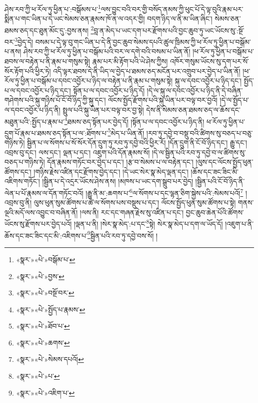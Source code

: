 ཤེས་རབ་ཀྱི་ཕ་རོལ་ཏུ་ཕྱིན་པ་:བསྒོམས་པ་\footnote{«སྣར་»«པེ་»བསྒོམ་པ་}ལས་བྱུང་བའི་བར་གྱི་བསོད་ནམས་ཀྱི་ཕུང་པོ་དེ་ལྟ་བུའི་རྣམ་པར་སྨིན་པ་གང་ཡིན་པ་དེ་ཡང་སེམས་ཅན་རྣམས་ཁོ་ན་ལ་འདར་གྱི། བདག་ཉིད་ལ་ནི་མ་ཡིན་ཞིང་། སེམས་ཅན་ཐམས་ཅད་དང་ཐུན་མོང་དུ་:བྱས་ནས། \footnote{«སྣར་»«པེ་»བྱས་}བླ་ན་མེད་པ་ཡང་དག་པར་རྫོགས་པའི་བྱང་ཆུབ་ཏུ་ཡང་ཡོངས་སུ་:སྔོ་བར་\footnote{«སྣར་»«པེ་»བསྔོ་བར་}བྱེད་དེ། བསམ་པ་དེ་ལྟ་བུ་གང་ཡིན་པ་དེ་ནི་བྱང་ཆུབ་སེམས་དཔའི་ཚུལ་ཁྲིམས་ཀྱི་ཕ་རོལ་ཏུ་ཕྱིན་པ་བསྒོམ་པ་ནས། ཤེས་རབ་ཀྱི་ཕ་རོལ་ཏུ་ཕྱིན་པ་བསྒོམ་པའི་བར་ལ་དགེ་བའི་བསམ་པ་ཡིན་ནོ། །ཕ་རོལ་ཏུ་ཕྱིན་པ་བསྒོམ་པ་ཐབས་ལ་བརྟེན་པ་ནི་རྣམ་པ་གསུམ་སྟེ། རྣམ་པར་མི་རྟོག་པའི་ཡེ་ཤེས་ཀྱིས། འཁོར་གསུམ་ཡོངས་སུ་དག་པར་སོ་སོར་རྟོག་པའི་ཕྱིར་ཏེ། འདི་ལྟར་ཐབས་དེ་ནི་ཡིད་ལ་བྱེད་པ་ཐམས་ཅད་མངོན་པར་འགྲུབ་པར་བྱེད་པ་ཡིན་ནོ། །ཕ་རོལ་ཏུ་ཕྱིན་པ་བསྒོམ་པ་དབང་འབྱོར་པ་ཉིད་ལ་བརྟེན་པ་ནི་རྣམ་པ་གསུམ་སྟེ། སྐུ་ལ་དབང་འབྱོར་པ་ཉིད་དང་། སྤྱོད་པ་ལ་དབང་འབྱོར་པ་ཉིད་དང་། སྟོན་པ་ལ་དབང་འབྱོར་པ་ཉིད་དོ། །དེ་ལ་སྐུ་ལ་དབང་འབྱོར་པ་ཉིད་ནི་དེ་བཞིན་གཤེགས་པའི་སྐུ་གཉིས་པོ་ངོ་བོ་ཉིད་ཀྱི་སྐུ་དང་། ལོངས་སྤྱོད་རྫོགས་པའི་སྐུ་ཡིན་པར་བལྟ་བར་བྱའོ། །དེ་ལ་སྤྱོད་པ་ལ་དབང་འབྱོར་པ་ཉིད་ནི། སྤྲུལ་པའི་སྐུ་ཡིན་པར་བལྟ་བར་བྱ་སྟེ། དེས་ནི་སེམས་ཅན་ཐམས་ཅད་ལ་ཆོས་དང་མཐུན་པའི་:སྤྱོད་པ་རྣམ་པ་\footnote{«སྣར་»«པེ་»སྤྱོད་པ་རྣམས་}ཐམས་ཅད་སྟོན་པར་བྱེད་དོ། །སྟོན་པ་ལ་དབང་འབྱོར་པ་ཉིད་ནི། ཕ་རོལ་ཏུ་ཕྱིན་པ་དྲུག་པོ་རྣམ་པ་ཐམས་ཅད་སྟོན་པ་ལ་:ཐོགས་པ་\footnote{«སྣར་»«པེ་»ཐོབ་པ་}མེད་པ་ཡིན་ནོ། །རབ་ཏུ་དབྱེ་བ་བསྡུ་བའི་ཚིགས་སུ་བཅད་པ་བཅུ་གཉིས་ཏེ། སྦྱིན་པ་ལ་སོགས་པ་སོ་སོར་དོན་དྲུག་ཏུ་རབ་ཏུ་དབྱེ་བའི་ཕྱིར་རོ། །དོན་དྲུག་ནི་ངོ་བོ་ཉིད་དང་། རྒྱུ་དང་། འབྲས་བུ་དང་། ལས་དང་། ལྡན་པ་དང་། འཇུག་པའི་དོན་རྣམས་སོ། །དེ་ལ་སྦྱིན་པའི་རབ་ཏུ་དབྱེ་བ་ལ་ཚིགས་སུ་བཅད་པ་གཉིས་ཏེ། དོན་རྣམས་གཏོང་བར་བྱེད་པ་དང་། །རྩ་བ་སེམས་པ་ལ་བརྟེན་དང་། །ལུས་དང་ལོངས་སྤྱོད་ཕུན་ཚོགས་དང་། །གཉིས་རྗེས་འཛིན་དང་རྫོགས་བྱེད་དང་། །དེ་ཡང་སེར་སྣ་མེད་ལྡན་དང་། །ཆོས་དང་ཟང་ཟིང་མི་འཇིགས་གཏོང་། །སྦྱིན་པ་དེ་འདྲར་ཡོངས་ཤེས་ནས། །མཁས་པ་ཡང་དག་སྒྲུབ་པར་བྱེད། །སྦྱིན་པའི་ངོ་བོ་ཉིད་ནི་ལེན་པ་པོ་རྣམས་ལ་དོན་གཏོང་བའོ། །རྒྱུ་ནི་མ་:ཆགས་པ་\footnote{«སྣར་»«པེ་»ཆགས་}ལ་སོགས་པ་དང་ལྷན་ཅིག་སྐྱེས་པའི་:སེམས་པའོ།\footnote{«སྣར་»«པེ་»སེམས་དཔའོ།} །འབྲས་བུ་ནི། ལུས་ཕུན་སུམ་ཚོགས་པ་ཚེ་ལ་སོགས་པས་བསྡུས་པ་དང་། ལོངས་སྤྱོད་ཕུན་སུམ་ཚོགས་པ་སྟེ། གནས་ལྔའི་མདོ་ལས་འབྱུང་བ་བཞིན་ནོ། །ལས་ནི། རང་དང་གཞན་རྗེས་སུ་འཛིན་པ་དང་། བྱང་ཆུབ་ཆེན་པོའི་ཚོགས་ཡོངས་སུ་རྫོགས་པར་བྱེད་པའོ། །ལྡན་པ་ནི། །སེར་སྣ་མེད་:པ་དང་\footnote{«སྣར་»«པེ་»པ་}སྟེ། སེར་སྣ་མེད་པ་དག་ལ་ཡོད་དོ། །འཇུག་པ་ནི་ཆོས་དང་ཟང་ཟིང་དང་མི་:འཇིགས་པ་\footnote{«སྣར་»«པེ་»འཇིག་པ་}སྦྱིན་པའི་རབ་ཏུ་དབྱེ་བས་སོ། །
